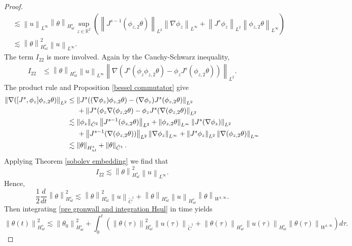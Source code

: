\documentclass[12pt,xcolor=svgnames]{amsart}
\newcommand{\R}{\mathbb{R}}
\newcommand{\norm}[2]{\left\lVert#1\right\rVert_{#2}}
\begin{document}
\begin{proof}
\begin{align*}
&\lesssim \norm{u}{L^{\infty}}\norm{\theta}{H^s_{ul}}\sup_{z \in \R^2}\left(\norm{J^{s-1}(\phi_{z,2}\theta)}{L^2}\norm{\nabla\phi_z}{L^{\infty}}+\norm{J^s\phi_z}{L^2}\norm{\phi_{z,2}\theta}{L^{\infty}}\right)\\
&\lesssim
\norm{\theta}{H_{ul}^s}^2 \norm{u}{L^{\infty}}.
\end{align*}
The term $I_{22}$ is more involved. Again by the Cauchy-Schwarz inequality, 
\begin{align*}
I_{22} &\leq \norm{\theta}{H_{ul}^s}\norm{u}{L^{\infty}}\norm{\nabla\left(J^s(\phi_z\phi_{z,2}\theta)-\phi_{z}J^s(\phi_{z,2}\theta)\right)}{L^2}.
\end{align*}
The product rule and Proposition \ref{bessel commutator} give 
\begin{align*}
\norm{\nabla([J^s,\phi_z]\phi_{z,2}\theta)}{L^2} 
&\leq \norm{J^s((\nabla\phi_z)\phi_{z,2}\theta) - (\nabla \phi_z)J^s(\phi_{z,2}\theta)}{L^2}\\
& \hspace{.5cm}+ \norm{J^s(\phi_z\nabla(\phi_{z,2}\theta)-\phi_zJ^s(\nabla(\phi_{z,2}\theta)}{L^2}
\\
&\lesssim \norm{\phi_z}{\tilde{C}^2}\norm{J^{s-1}(\phi_{z,2}\theta)}{L^2}+\norm{\phi_{z,2}\theta}{L^{\infty}}\norm{J^{s}(\nabla\phi_z)}{L^2} \\
&  \hspace{.5cm}+ \norm{J^{s-1}(\nabla(\phi_{z,2}\theta))}{L^2}\norm{\nabla \phi_z}{L^{\infty}}+\norm{J^s\phi_z}{L^2}\norm{\nabla(\phi_{z,2}\theta)}{L^{\infty}}\\
&\lesssim \norm{\theta}{H_{ul}^s} + \norm{\theta}{\tilde{C}^1}.
\end{align*}
Applying Theorem \ref{sobolev embedding} we find that $$I_{22} \lesssim \norm{\theta}{H_{ul}^s}^2\norm{u}{L^{\infty}}.$$
Hence,
\begin{equation}
\label{pre gronwall and integration Hsul}
\frac{1}{2}\frac{d}{dt}\norm{\theta}{H_{ul}^s}^2 \lesssim \norm{\theta}{H_{ul}^s}^2\norm{u}{\tilde{C}^1} + \norm{\theta}{H_{ul}^s}\norm{u}{H_{ul}^s}\norm{\theta}{W^{1,\infty}}.
\end{equation}
Then integrating \eqref{pre gronwall and integration Hsul} in time yields
\begin{equation}
\label{a-priori pre velocity estimate Hsul}
\norm{\theta(t)}{H_{ul}^s}^2 \lesssim \norm{\theta_0}{H_{ul}^s}^2 + \int_0^t \left (\norm{\theta(\tau)}{H_{ul}^s}^2\norm{u(\tau)}{\tilde{C}^1} + \norm{\theta(\tau)}{H_{ul}^s}\norm{u(\tau)}{H_{ul}^s}\norm{\theta(\tau)}{W^{1,\infty}} \right) d\tau.

\end{equation}
\end{proof}
\end{document}
